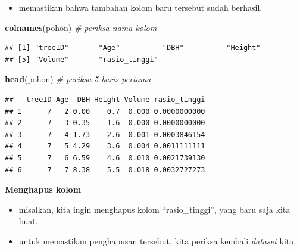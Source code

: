 \documentclass[
  12pt,
  a4paper,
]{scrbook}
\newenvironment{Shaded}{\begin{snugshade}}{\end{snugshade}}
\newcommand{\CommentTok}[1]{\textcolor[rgb]{0.56,0.35,0.01}{\textit{#1}}}
\newcommand{\KeywordTok}[1]{\textcolor[rgb]{0.13,0.29,0.53}{\textbf{#1}}}
\newcommand{\NormalTok}[1]{#1}
\newcommand{\OperatorTok}[1]{\textcolor[rgb]{0.81,0.36,0.00}{\textbf{#1}}}
\newcommand{\OtherTok}[1]{\textcolor[rgb]{0.56,0.35,0.01}{#1}}
\newcommand{\StringTok}[1]{\textcolor[rgb]{0.31,0.60,0.02}{#1}}
\providecommand{\tightlist}{%
  \setlength{\itemsep}{0pt}\setlength{\parskip}{0pt}}
\begin{document}
\begin{itemize}
\tightlist
\item
  memastikan bahwa tambahan kolom baru tersebut sudah berhasil.
\end{itemize}

\begin{Shaded}
\begin{Highlighting}[]
\KeywordTok{colnames}\NormalTok{(pohon)  }\CommentTok{# periksa nama kolom}
\end{Highlighting}
\end{Shaded}

\begin{verbatim}
## [1] "treeID"       "Age"          "DBH"          "Height"      
## [5] "Volume"       "rasio_tinggi"
\end{verbatim}

\begin{Shaded}
\begin{Highlighting}[]
\KeywordTok{head}\NormalTok{(pohon)  }\CommentTok{# periksa 5 baris pertama}
\end{Highlighting}
\end{Shaded}

\begin{verbatim}
##   treeID Age  DBH Height Volume rasio_tinggi
## 1      7   2 0.00    0.7  0.000 0.0000000000
## 2      7   3 0.35    1.6  0.000 0.0000000000
## 3      7   4 1.73    2.6  0.001 0.0003846154
## 4      7   5 4.29    3.6  0.004 0.0011111111
## 5      7   6 6.59    4.6  0.010 0.0021739130
## 6      7   7 8.38    5.5  0.018 0.0032727273
\end{verbatim}

\textbf{Menghapus kolom}

\begin{itemize}
\tightlist
\item
  misalkan, kita ingin menghapus kolom ``rasio\_tinggi'', yang baru saja
  kita buat.
\end{itemize}

\begin{Shaded}
\end{Shaded}

\begin{itemize}
\tightlist
\item
  untuk memastikan penghapusan tersebut, kita periksa kembali
  \emph{dataset} kita.
\end{itemize}
\end{document}

